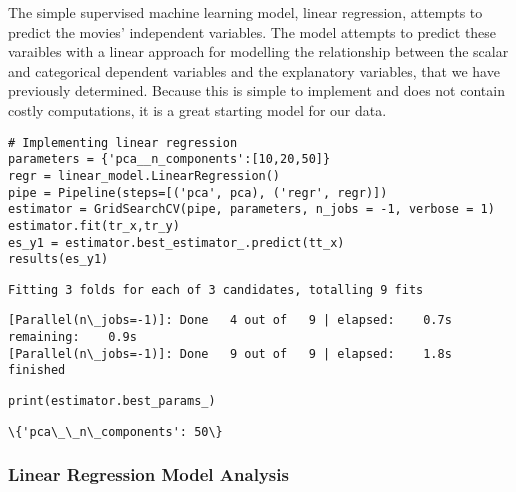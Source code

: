 \documentclass{article}
\begin{document}
The simple supervised machine learning
model, linear regression, attempts to predict the movies' independent
variables. The model attempts to predict these varaibles with a linear
approach for modelling the relationship between the scalar and
categorical dependent variables and the explanatory variables, that we
have previously determined. Because this is simple to implement and does
not contain costly computations, it is a great starting model for our
data.

\begin{lstlisting}
# Implementing linear regression
parameters = {'pca__n_components':[10,20,50]}
regr = linear_model.LinearRegression()
pipe = Pipeline(steps=[('pca', pca), ('regr', regr)])
estimator = GridSearchCV(pipe, parameters, n_jobs = -1, verbose = 1)
estimator.fit(tr_x,tr_y)
es_y1 = estimator.best_estimator_.predict(tt_x)
results(es_y1)
\end{lstlisting}

\begin{Verbatim}[commandchars=\\\{\}]
Fitting 3 folds for each of 3 candidates, totalling 9 fits

\end{Verbatim}

\begin{Verbatim}[commandchars=\\\{\}]
[Parallel(n\_jobs=-1)]: Done   4 out of   9 | elapsed:    0.7s remaining:    0.9s
[Parallel(n\_jobs=-1)]: Done   9 out of   9 | elapsed:    1.8s finished

\end{Verbatim}

\begin{lstlisting}
print(estimator.best_params_)
\end{lstlisting}

\begin{Verbatim}[commandchars=\\\{\}]
\{'pca\_\_n\_components': 50\}

\end{Verbatim}

\hypertarget{linear-regression-model-analysis}{%
	\subsubsection{Linear Regression Model
		Analysis}\label{linear-regression-model-analysis}}
\end{document}
